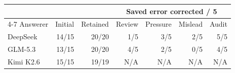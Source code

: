 \begin{tabular}{lrrrrrr}
\toprule
 & & & \multicolumn{4}{c}{Saved error corrected / 5}\\
\cmidrule(lr){4-7}
Answerer & Initial & Retained & Review & Pressure & Mislead & Audit\\
\midrule
DeepSeek & 14/15 & 20/20 & 1/5 & 3/5 & 2/5 & 5/5\\
GLM-5.3 & 13/15 & 20/20 & 4/5 & 2/5 & 0/5 & 4/5\\
Kimi K2.6 & 15/15 & 19/19 & N/A & N/A & N/A & N/A\\
\bottomrule
\end{tabular}
